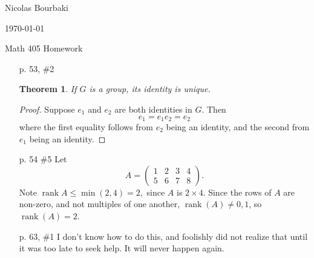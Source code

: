 \documentclass[12pt]{report}
\theoremstyle{plain}
\newtheorem*{thm*}{Theorem}
\newcommand{\rank}{\operatorname{rank}} %
\begin{document}
\hfill Nicolas Bourbaki %

\hfill \today 

\centerline{\large{Math 405 Homework}}

\begin{enumerate}

\item[p. 53, \#2]
\begin{thm*} If $G$ is a group, its identity is unique.
\end{thm*}
\begin{proof}
Suppose $e_1$ and $e_2$ are both identities in $G$. Then
$$e_1=e_1e_2=e_2$$
where the first equality follows from $e_2$ being an identity, and the second from $e_1$ being an identity.
\end{proof}

 \item[p. 54 \#5] %
Let 
$$A=\begin{pmatrix}1&2&3&4\\5&6&7&8\end{pmatrix}.$$
Note $\rank{A}\le \min(2,4)=2,$ since $A$ is $2\times 4$.
Since the rows of $A$ are non-zero, and not multiples of one another, $\rank(A)\ne 0,1$, so $\rank(A)=2$.

\item[p. 63, \#1] %
I don't know how to do this, and foolishly did not realize that until it was too late to seek help. It will never happen again.


\end{enumerate}
\end{document}
